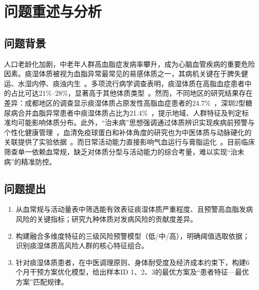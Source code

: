 \documentclass[a4paper,12pt]{ctexart}
\begin{document}
\newpage

\thispagestyle{empty}
\tableofcontents
\newpage

\setcounter{page}{1}

\section{问题重述与分析}

\subsection{问题背景}
人口老龄化加剧，中老年人群高血脂症发病率攀升，成为心脑血管疾病的重要危险因素。痰湿体质被视为血脂异常最常见的易感体质之一，其病机关键在于脾失健运、水湿内停、痰浊内生~\cite{jin2026tcm,yu2020hyperlipid}。多项流行病学调查表明，痰湿体质在高脂血症患者中的占比可达21\%--28\%，显著高于其他体质类型~\cite{jia2021chengdu,huang2025t2dm}。然而，不同地区的研究结果存在差异：成都地区的调查显示痰湿体质占原发性高脂血症患者的24.7\%~\cite{jia2021chengdu}，深圳2型糖尿病合并血脂异常患者中痰湿体质占比为21.4\%~\cite{huang2025t2dm}，提示地域、人群特征及判定标准均可能影响体质分布。此外，``治未病''思想强调通过体质辨识实现疾病前预警与个性化健康管理~\cite{yao2019preventive,yu2026health}，血清免疫球蛋白和补体角度的研究也为中医体质与动脉硬化的关联提供了实验依据~\cite{wang2025arteriosclerosis}。而日常活动能力直接影响气血运行与膏脂运化~\cite{zhang2025gut}。目前临床筛查单一依赖血常规，缺乏对体质分型与活动能力的综合考量，难以实现``治未病''的精准防控。

\subsection{问题提出}
\begin{enumerate}[label=\textbf{问题\arabic*}]
    \item 从血常规与活动量表中筛选能有效表征痰湿体质严重程度、且预警高血脂发病风险的关键指标；研究九种体质对发病风险的贡献度差异。
    \item 构建融合多维度特征的三级风险预警模型（低/中/高），明确阈值选取依据；识别痰湿体质高风险人群的核心特征组合。
    \item 针对痰湿体质患者，在中医调理原则、身体耐受度及经济成本约束下，构建6个月干预方案优化模型，给出样本ID 1、2、3的最优方案及``患者特征—最优方案''匹配规律。
\end{enumerate}
\end{document}
